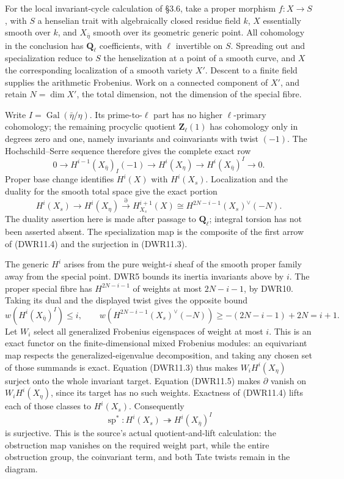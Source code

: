For the local invariant-cycle calculation of §3.6, take a proper
morphism \(f:X\to S\), with \(S\) a henselian trait with algebraically
closed residue field \(k\), \(X\) essentially smooth over \(k\), and
\(X_{\bar\eta}\) smooth over its geometric generic point. All cohomology
in the conclusion has \(\mathbf Q_\ell\) coefficients, with \(\ell\)
invertible on \(S\). Spreading out and specialization reduce to \(S\)
the henselization at a point of a smooth curve, and \(X\) the
corresponding localization of a smooth variety \(X'\). Descent to a
finite field supplies the arithmetic Frobenius. Work on a connected
component of \(X'\), and retain \(N=\dim X'\), the total dimension, not
the dimension of the special fibre.

Write \(I=\operatorname{Gal}(\bar\eta/\eta)\). Its prime-to-\(\ell\)
part has no higher \(\ell\)-primary cohomology; the remaining procyclic
quotient \(\mathbf Z_\ell(1)\) has cohomology only in degrees zero and
one, namely invariants and coinvariants with twist \((-1)\). The
Hochschild--Serre sequence therefore gives the complete exact row \[
0\longrightarrow H^{i-1}(X_{\bar\eta})_I(-1)
\longrightarrow H^i(X_\eta)
\longrightarrow H^i(X_{\bar\eta})^I
\longrightarrow0.
\tag{DWR11.3}
\] Proper base change identifies \(H^i(X)\) with \(H^i(X_s)\).
Localization and the duality for the smooth total space give the exact
portion \[
H^i(X_s)\longrightarrow H^i(X_\eta)
\xrightarrow{\partial}H^{i+1}_{X_s}(X)
\cong H^{2N-i-1}(X_s)^\vee(-N).
\tag{DWR11.4}
\] The duality assertion here is made after passage to
\(\mathbf Q_\ell\); integral torsion has not been asserted absent. The
specialization map is the composite of the first arrow of (DWR11.4) and
the surjection in (DWR11.3).

The generic \(H^i\) arises from the pure weight-\(i\) sheaf of the
smooth proper family away from the special point. DWR5 bounds its
inertia invariants above by \(i\). The proper special fibre has
\(H^{2N-i-1}\) of weights at most \(2N-i-1\), by DWR10. Taking its dual
and the displayed twist gives the opposite bound \[
w\!\left(H^i(X_{\bar\eta})^I\right)\le i,\qquad
w\!\left(H^{2N-i-1}(X_s)^\vee(-N)\right)
\ge -(2N-i-1)+2N=i+1.
\tag{DWR11.5}
\] Let \(W_i\) select all generalized Frobenius eigenspaces of weight at
most \(i\). This is an exact functor on the finite-dimensional mixed
Frobenius modules: an equivariant map respects the
generalized-eigenvalue decomposition, and taking any chosen set of those
summands is exact. Equation (DWR11.3) thus makes \(W_iH^i(X_\eta)\)
surject onto the whole invariant target. Equation (DWR11.5) makes
\(\partial\) vanish on \(W_iH^i(X_\eta)\), since its target has no such
weights. Exactness of (DWR11.4) lifts each of those classes to
\(H^i(X_s)\). Consequently \[
\operatorname{sp}^*:H^i(X_s)\twoheadrightarrow H^i(X_{\bar\eta})^I
\tag{DWR11.6}
\] is surjective. This is the source's actual quotient-and-lift
calculation: the obstruction map vanishes on the required weight part,
while the entire obstruction group, the coinvariant term, and both Tate
twists remain in the diagram.

